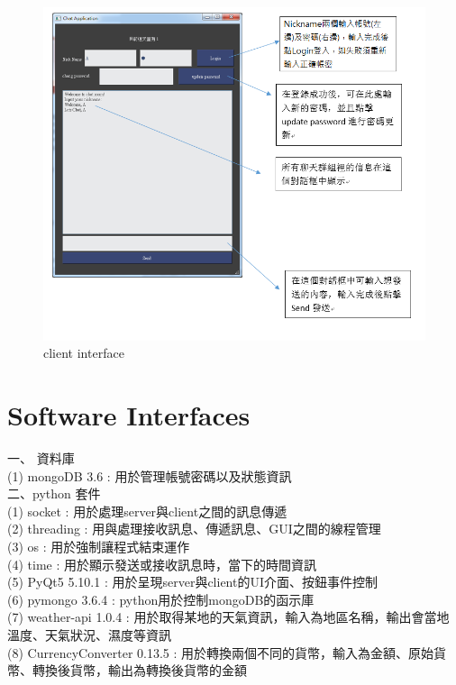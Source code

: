 \documentclass{scrreprt}
\begin{document}
\begin{CJK}{UTF8}{bkai}
\begin{figure}[h]
\begin{center}
\includegraphics[width=15cm]{interface2.png}
\end{center}
\caption{client interface}
\label{fig:3}
\end{figure}



\section{Software Interfaces}
一、 資料庫 \\
(1) mongoDB 3.6 : 用於管理帳號密碼以及狀態資訊 \\
二、python 套件 \\
(1) socket : 用於處理server與client之間的訊息傳遞 \\
(2) threading : 用與處理接收訊息、傳遞訊息、GUI之間的線程管理 \\
(3) os : 用於強制讓程式結束運作\\
(4) time : 用於顯示發送或接收訊息時，當下的時間資訊\\
(5) PyQt5 5.10.1 : 用於呈現server與client的UI介面、按鈕事件控制\\
(6) pymongo 3.6.4 : python用於控制mongoDB的函示庫\\
(7) weather-api 1.0.4 : 用於取得某地的天氣資訊，輸入為地區名稱，輸出會當地溫度、天氣狀況、濕度等資訊\\
(8) CurrencyConverter 0.13.5 : 用於轉換兩個不同的貨幣，輸入為金額、原始貨幣、轉換後貨幣，輸出為轉換後貨幣的金額 \\


\end{CJK}
\end{document}
